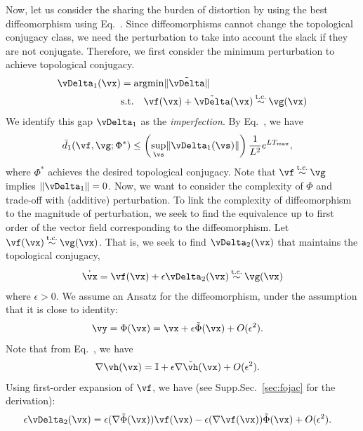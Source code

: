 \documentclass{article}
\theoremstyle{definition} \newtheorem{definition}{Definition}  \newtheorem{example}{Example}
\theoremstyle{remark} \newtheorem{remark}{Remark}
\renewcommand{\eqref}{Eq.~\originaleqref}
\newcounter{ct}
\DeclareMathOperator*{\argmin}{\rm argmin}
\DeclarePairedDelimiter{\norm}{\lVert}{\rVert}
\newcommand{\tconju}{\mathbin{\overset{\text{t.c.}}{\sim}}}
\newcommand{\identity}{\ensuremath{\mathbb{I}}}
\newcommand{\homeo}{\Phi} %
\begin{document}
Now, let us consider the sharing the burden of distortion by using the best diffeomorphism using \eqref{eq:ed1}.
Since diffeomorphisms cannot change the topological conjugacy class, we need the perturbation to take into account the slack if they are not conjugate.
Therefore, we first consider the minimum perturbation to achieve topological conjugacy.
\begin{align}
    \vDelta_1(\vx) &= \argmin \norm{\tilde \vDelta}
    \label{eq:d1:min}
    \\
    & \text{s.t.} \quad
    \vf(\vx) + \tilde \vDelta(\vx)
    \tconju
    \vg(\vx)
    \label{eq:d1:tc}
\end{align}
We identify this gap $\vDelta_1$ as the \emph{imperfection}.
By \eqref{eq:d0bound}, we have
\begin{align}
    \bar{d}_1(\vf, \vg; \homeo^\ast)
	&\leq
	\left(\sup_\vs \norm{\vDelta_1(\vs)}\right) \frac{1}{L^2} e^{LT_{\text{max}}},
\end{align}
where $\homeo^\ast$ achieves the desired topological conjugacy.
Note that $\vf \tconju \vg$ implies $\norm{\vDelta_1} = 0$.
Now, we want to consider the complexity of $\homeo$ and trade-off with (additive) perturbation.
To link the complexity of diffeomorphism to the magnitude of perturbation, we seek to find the equivalence up to first order of the vector field corresponding to the diffeomorphism.
Let
$
\vf(\vx)
    \tconju
\vg(\vx)
$.
That is, we seek to find $\vDelta_2(\vx)$ that maintains the topological conjugacy,
\begin{align}
    \dot\vx = \vf(\vx) + \epsilon \vDelta_2(\vx)
    \tconju
    \vg(\vx)
    \label{eq:pareto:tc}
\end{align}
where $\epsilon > 0$.
We assume an Ansatz for the diffeomorphism, under the assumption that it is close to identity:
\begin{align}\label{eq:h:ansatz}
    \vy &= \homeo(\vx) = \vx + \epsilon \tilde\homeo(\vx) + O(\epsilon^2).
\end{align}
Note that from \eqref{eq:h:ansatz}, we have
\begin{align}
    \nabla\vh(\vx) &= \identity + \epsilon\nabla\tilde\vh(\vx) + O(\epsilon^2).
\end{align}
Using first-order expansion of $\vf$, we have (see Supp.Sec.~\ref{sec:fojac} for the derivation):
\begin{align}
    \epsilon \vDelta_2(\vx) &=
	\epsilon (\nabla\tilde\homeo(\vx)) \vf(\vx)
	-
	\epsilon (\nabla\vf(\vx)) \tilde\homeo(\vx)
	+ O(\epsilon^2).
\end{align}
\end{document}
